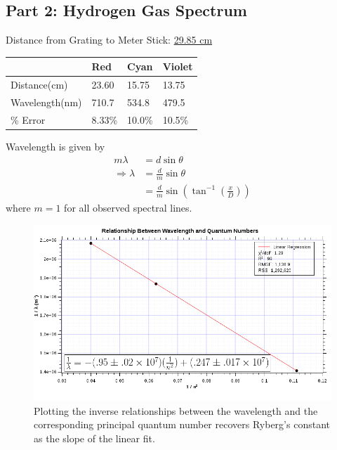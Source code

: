 \documentclass[twocolumn,english]{IEEEtran}
\theoremstyle{plain}
\theoremstyle{plain}
\begin{document}
\noindent\hrulefill


\subsection{Part 2: Hydrogen Gas Spectrum}
Distance from Grating to Meter Stick: \hfill\underline{29.85 cm}

\begin{table}[!htpb]
\centering
\begin{tabular}{@{}llll@{}}
\toprule
				& Red		& Cyan 		& Violet 		\\ \midrule
Distance(cm)   	& 23.60		& 15.75 	& 13.75    		\\
Wavelength(nm) 	& 710.7     & 534.8 	& 479.5     	\\
\% Error   		& 8.33\%    & 10.0\% 	& 10.5\%     	\\ \bottomrule
\end{tabular}
\end{table}

Wavelength is given by
\begin{align*}
	m\lambda &= d\sin\theta \\
	\Rightarrow\lambda &= \frac{d}{m}\sin\theta \\
			&= \frac{d}{m}\sin\left(\tan^{-1}\left(\frac{x}{D}\right)\right)
\end{align*}
where $m=1$ for all observed spectral lines.

\begin{figure}[h!]
	\begin{centering}
	\begin{center}
	\includegraphics[width=\linewidth]{./Ryberg_graph.png}
	\caption{Plotting the inverse relationships between the wavelength and the corresponding principal quantum number recovers Ryberg's constant as the slope of the linear fit.}
	\label{fig:Ryberg_graph}
	\end{center}
	\par\end{centering}
\end{figure}
\end{document}
